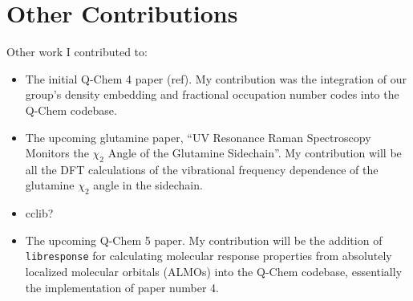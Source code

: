 \chapter{Other Contributions}
\label{ch:other_contributions}

Other work I contributed to:

\begin{itemize}
\item The initial Q-Chem 4 paper (ref). My contribution was the integration of our group's density embedding and fractional occupation number codes into the Q-Chem codebase.
\item The upcoming glutamine paper, ``UV Resonance Raman Spectroscopy Monitors the \(\chi_2\) Angle of the Glutamine Sidechain''. My contribution will be all the DFT calculations of the vibrational frequency dependence of the glutamine \(\chi_2\) angle in the sidechain.
\item cclib?
\item The upcoming Q-Chem 5 paper. My contribution will be the addition of \texttt{libresponse} for calculating molecular response properties from absolutely localized molecular orbitals (ALMOs) into the Q-Chem codebase, essentially the implementation of paper number 4.
\end{itemize}
